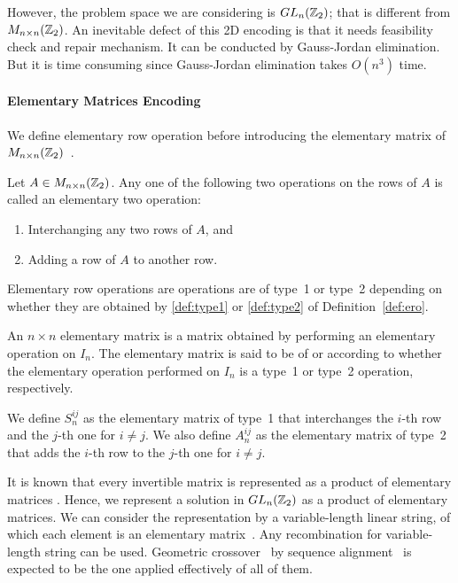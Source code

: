 


However, the problem space we are considering is $ GL_n(\mathbb{Z}_2) $; that is different from $ M_{n \times n}(\mathbb{Z}_2) $.
An inevitable defect of this 2D encoding is that it needs feasibility check and repair mechanism.
It can be conducted by Gauss-Jordan elimination. But it is time consuming since Gauss-Jordan elimination takes $ O(n^3) $ time.


\paragraph{Elementary Matrices Encoding}

We define elementary row operation before introducing the elementary matrix of $ M_{n \times n}(\mathbb{Z}_2) $~\cite{yoon2014mathematical}.

\begin{Definition} \label{def:ero}
    Let $ A \in M_{n \times n}(\mathbb{Z}_2) $. Any one of the following two operations on the rows of $ A $ is called an elementary two operation:
    \begin{enumerate}
        \item Interchanging any two rows of $ A $, and \label{def:type1}
        \item Adding a row of $ A $ to another row. \label{def:type2}
    \end{enumerate}
\end{Definition}

Elementary row operations are operations are of type~1 or type~2 depending on whether they are obtained by \eqref{def:type1} or \eqref{def:type2} of Definition~\ref{def:ero}.

\begin{Definition} \label{def:em}
    An $ n \times n $ elementary matrix is a matrix obtained by performing an elementary operation on $ I_n $.
    The elementary matrix is said to be of  or  according to whether the elementary operation performed on $ I_n $ is a type~1 or type~2 operation, respectively.
\end{Definition}

We define $ S_n^{ij} $ as the elementary matrix of type~1 that interchanges the $i$-th row and the $j$-th one for $ i \neq j $.
We also define $ A_n^{ij} $ as the elementary matrix of type~2 that adds the $i$-th row to the $j$-th one for $ i \neq j $.


It is known that every invertible matrix is represented as a product of elementary matrices \cite{friedberglinear}.
Hence, we represent a solution in $ GL_n(\mathbb{Z}_2) $ as a product of elementary matrices.
We can consider the representation by a variable-length linear string, of which each element is an elementary matrix~\cite{yoon2014mathematical}.
Any recombination for variable-length string can be used.
Geometric crossover~
\cite{moraglio2007geometric,moraglio2004topological,yoon2013efficient,yoon2013geometricity,yoon2012quotient,yoon2012theoretical}
by sequence alignment~\cite{moraglio2006geometric,yoon2009mathematical,yoon2009amathematical} is expected to be the one applied effectively of all of them.

